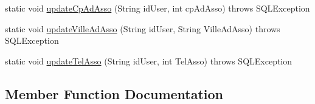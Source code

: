 \begin{DoxyCompactItemize}
\item 
static void \hyperlink{classcom_1_1ecetech_1_1bti4_1_1itproject_1_1classified_1_1dao_1_1_association_d_a_o_a7c9c96fcfb5e950d61f79df851f9575b}{update\+Cp\+Ad\+Asso} (String id\+User, int cp\+Ad\+Asso)  throws S\+Q\+L\+Exception 
\item 
static void \hyperlink{classcom_1_1ecetech_1_1bti4_1_1itproject_1_1classified_1_1dao_1_1_association_d_a_o_a65048bf95fdcd35ee35d5c0bee623b8b}{update\+Ville\+Ad\+Asso} (String id\+User, String Ville\+Ad\+Asso)  throws S\+Q\+L\+Exception 
\item 
static void \hyperlink{classcom_1_1ecetech_1_1bti4_1_1itproject_1_1classified_1_1dao_1_1_association_d_a_o_a4714a27c39d0537a449cc3f47cf9e737}{update\+Tel\+Asso} (String id\+User, int Tel\+Asso)  throws S\+Q\+L\+Exception 
\end{DoxyCompactItemize}


\subsection{Member Function Documentation}
